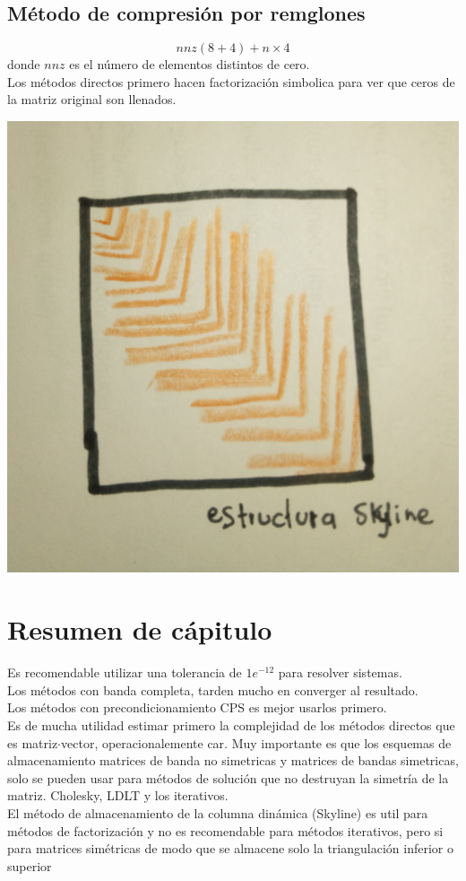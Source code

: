 \subsection{M\'etodo de compresi\'on por remglones}
\begin{displaymath}
nnz(8+4)+n\times 4
\end{displaymath} 
donde $nnz$ es el n\'umero de elementos distintos de cero.\\
Los m\'etodos directos primero hacen factorizaci\'on simbolica para ver que ceros de la matriz original son llenados.
\begin{center}
\includegraphics[scale=.05]{imagenes/12.jpg}
\end{center}

\section{Resumen de cápitulo}
Es recomendable utilizar una tolerancia de $1e^{-12}$ para resolver sistemas.\\
Los m\'etodos con banda completa, tarden mucho en converger al resultado.\\
Los m\'etodos con precondicionamiento CPS es mejor usarlos primero.\\
Es de mucha utilidad estimar primero la complejidad de los m\'etodos directos que es matriz$\cdot$vector, operacionalemente car. 
Muy importante es que los esquemas de almacenamiento matrices de banda no simetricas y matrices de bandas simetricas, solo se pueden usar para m\'etodos de soluci\'on que no destruyan la simetr\'ia de la matriz. Cholesky, LDLT y los iterativos.\\
El m\'etodo de almacenamiento de la columna din\'amica (Skyline) es util para m\'etodos de factorizaci\'on y no es recomendable para m\'etodos iterativos, pero si para matrices sim\'etricas de modo que se almacene solo la triangulaci\'on inferior o superior 